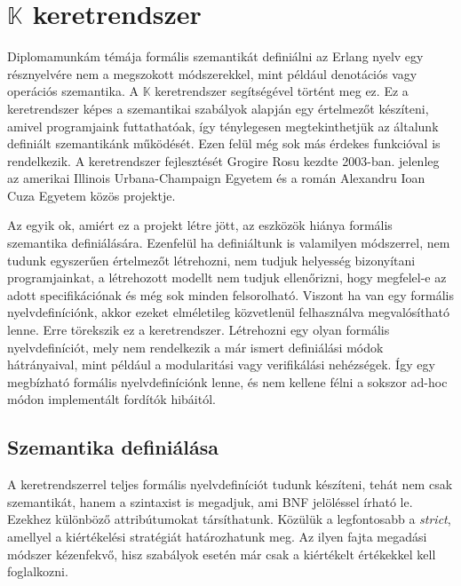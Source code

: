 \section{$\mathbb{K}$ keretrendszer}

Diplomamunkám témája formális szemantikát definiálni az Erlang nyelv egy résznyelvére nem a megszokott módszerekkel, mint például denotációs vagy operációs szemantika. A $\mathbb{K}$ keretrendszer segítségével történt meg ez. Ez a keretrendszer képes a szemantikai szabályok alapján egy értelmezőt készíteni, amivel programjaink futtathatóak, így ténylegesen megtekinthetjük az általunk definiált szemantikánk működését. Ezen felül még sok más érdekes funkcióval is rendelkezik. A keretrendszer fejlesztését Grogire Rosu kezdte 2003-ban. jelenleg az amerikai Illinois Urbana-Champaign Egyetem és a román Alexandru Ioan Cuza Egyetem közös projektje.


Az egyik ok, amiért ez a projekt létre jött, az eszközök hiánya formális szemantika definiálására. Ezenfelül ha definiáltunk is valamilyen módszerrel, nem tudunk egyszerűen értelmezőt létrehozni, nem tudjuk helyesség bizonyítani programjainkat, a létrehozott modellt nem tudjuk ellenőrizni, hogy megfelel-e az adott specifikációnak és még sok minden felsorolható. Viszont ha van egy formális nyelvdefiníciónk, akkor ezeket elméletileg közvetlenül felhasználva megvalósítható lenne. Erre törekszik ez a keretrendszer. Létrehozni egy olyan formális nyelvdefiníciót, mely nem rendelkezik a már ismert definiálási módok hátrányaival, mint például a modularitási vagy verifikálási nehézségek. Így egy megbízható formális nyelvdefiníciónk lenne, és nem kellene félni a sokszor ad-hoc módon implementált fordítók hibáitól.

\subsection{Szemantika definiálása}

A keretrendszerrel teljes formális nyelvdefiníciót tudunk készíteni, tehát nem csak szemantikát, hanem a szintaxist is megadjuk, ami BNF jelöléssel írható le. Ezekhez különböző attribútumokat társíthatunk. Közülük a legfontosabb a \textit{strict}, amellyel a kiértékelési stratégiát határozhatunk meg. Az ilyen fajta megadási módszer kézenfekvő, hisz szabályok esetén már csak a kiértékelt értékekkel kell foglalkozni.



